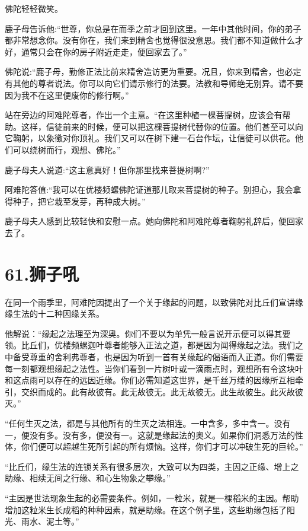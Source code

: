 \documentclass[12pt,twoside,openany]{book}
\begin{document}
佛陀轻轻微笑。

鹿子母告诉他:“世尊，你总是在而季之前才回到这里。一年中其他时间，你的弟子都非常想念你。没有你在，我们来到精舍也觉得很没意思。我们都不知道做什么才好，通常只会在你的房子附近走走，便回家去了。”

佛陀说:“鹿子母，勤修正法比前来精舍造访更为重要。况且，你来到精舍，也必定有其他的尊者说法。你可以向它们请示修行的法要。法教和导师绝无别异。请不要因为我不在这里便废你的修行啊。”

站在旁边的阿难陀尊者，作出一个主意。“在这里种植一棵菩提树，应该会有帮助。这样，信徒前来的时候，便可以把这棵菩提树代替你的位置。他们甚至可以向它鞠躬，以象徵对你顶礼。我们又可以在树下建一石台作坛，让信徒可以供花。他们可以绕树而行，观想、佛陀。”

鹿子母夫人说道:“这主意真好！但你那里找来菩提树啊?”

阿难陀答值:“我可以在优楼频螺佛陀证道那儿取来菩提树的种子。别担心，我会拿得种子，把它栽至发芽，再种成大树。”

鹿子母夫人感到比较轻快和安慰一点。她向佛陀和阿难陀尊者鞠躬礼辞后，便回家去了。


\chapter{61.狮子吼}\label{ch61}

在同一个雨季里，阿难陀因提出了一个关于缘起的问题，以致佛陀对比丘们宣讲缘缘生法的十二种因缘关系。

他解说：“缘起之法理至为深奥。你们不要以为单凭一般言说开示便可以得其要领。比丘们，优楼频螺迦叶尊者能够入正法之道，都是因为闻得缘起之法。我们之中备受尊重的舍利弗尊者，也是因为听到一首有关缘起的偈语而入正道。你们需要每一刻都观想缘起之法性。当你们看到一片树叶或一滴雨点时，观想所有令这块叶和这点雨可以存在的远因近缘。你们必需知道这世界，是千丝万缕的因缘所互相牵引，交织而成的。此有故彼有。此无故彼无。此无故彼无。此生故彼生。此灭故彼灭。”

“任何生灭之法，都是与其他所有的生灭之法相连。一中含多，多中含一。没有一，便没有多。没有多，便没有一。这就是缘起法的奥义。如果你们洞悉万法的性体，你们便可以超越生死所引起的所有烦恼。这样，你们才可以冲破生死的巨轮。”

“比丘们，缘生法的连锁关系有很多层次，大致可以为四类，主因之正缘、增上之助缘、相续无间之行缘、和心生物象之攀缘。”

“主因是世法现象生起的必需要条件。例如，一粒米，就是一棵稻米的主因。帮助增加这粒米生长成稻的种种因素，就是助缘。在这个例子里，这些助缘包括了阳光、雨水、泥土等。”
\end{document}
